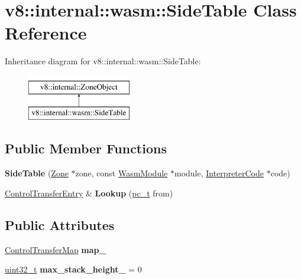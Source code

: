 \hypertarget{classv8_1_1internal_1_1wasm_1_1SideTable}{}\section{v8\+:\+:internal\+:\+:wasm\+:\+:Side\+Table Class Reference}
\label{classv8_1_1internal_1_1wasm_1_1SideTable}
Inheritance diagram for v8\+:\+:internal\+:\+:wasm\+:\+:Side\+Table\+:\begin{figure}[H]
\begin{center}
\leavevmode
\includegraphics[height=2.000000cm]{classv8_1_1internal_1_1wasm_1_1SideTable}
\end{center}
\end{figure}
\subsection*{Public Member Functions}
\begin{DoxyCompactItemize}
\item 
\mbox{\label{classv8_1_1internal_1_1wasm_1_1SideTable_a94cc078da69affee22b027ffb111df6d}} 
{\bfseries Side\+Table} (\mbox{\hyperlink{classv8_1_1internal_1_1Zone}{Zone}} $\ast$zone, const \mbox{\hyperlink{structv8_1_1internal_1_1wasm_1_1WasmModule}{Wasm\+Module}} $\ast$module, \mbox{\hyperlink{structv8_1_1internal_1_1wasm_1_1InterpreterCode}{Interpreter\+Code}} $\ast$code)
\item 
\mbox{\label{classv8_1_1internal_1_1wasm_1_1SideTable_a0f873453d20880f0ba7a9f94e9d1280d}} 
\mbox{\hyperlink{structv8_1_1internal_1_1wasm_1_1ControlTransferEntry}{Control\+Transfer\+Entry}} \& {\bfseries Lookup} (\mbox{\hyperlink{classsize__t}{pc\+\_\+t}} from)
\end{DoxyCompactItemize}
\subsection*{Public Attributes}
\begin{DoxyCompactItemize}
\item 
\mbox{\label{classv8_1_1internal_1_1wasm_1_1SideTable_ae8da79e87f1f49bff3e0026335ef7399}} 
\mbox{\hyperlink{classv8_1_1internal_1_1ZoneMap}{Control\+Transfer\+Map}} {\bfseries map\+\_\+}
\item 
\mbox{\label{classv8_1_1internal_1_1wasm_1_1SideTable_a989d49bc5ace5049cb000728f53b3a5b}} 
\mbox{\hyperlink{classuint32__t}{uint32\+\_\+t}} {\bfseries max\+\_\+stack\+\_\+height\+\_\+} = 0
\end{DoxyCompactItemize}


